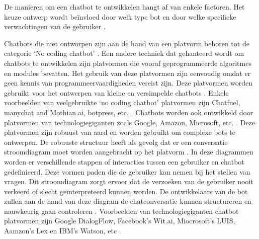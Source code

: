 De manieren om een chatbot te ontwikkelen hangt af van enkele factoren. Het keuze ontwerp wordt beïnvloed door welk type bot en door welke specifieke verwachtingen van de gebruiker \autocite{Rahman2017}.

Chatbots die niet ontworpen zijn aan de hand van een platvorm behoren tot de categorie ‘No coding chatbot’ \autocite{Tamrakar2021}. Een andere techniek dat gehanteerd wordt om chatbots te ontwikkelen zijn platvormen die vooraf geprogrammeerde algoritmes en modules bevatten. Het gebruik van deze platvormen zijn eenvoudig omdat er geen kennis van programmeervaardigheden vereist zijn. Deze platvormen worden gebruikt voor het ontwerpen van kleine en versimpelde chatbots  \autocite{Rahman2017}. Enkele voorbeelden van veelgebruikte ‘no coding chatbot’ platvormen zijn Chatfuel, manychat and Mothian.ai, botpress, etc.  \autocite{Rahman2017}. 
Chatbots worden ook ontwikkeld door platvormen van technologiegiganten zoals Google, Amazon, Microsoft, etc. \autocite{Gkikas2021}. Deze platvormen zijn robuust van aard en worden gebruikt om complexe bots te ontwerpen. De robuuste structuur heeft als gevolg dat er een conversatie stroomdiagram moet worden aangebracht op het platvorm \autocite{Tamrakar2021}. In deze diagrammen worden er verschillende stappen of interacties tussen een gebruiker en chatbot gedefinieerd. Deze vormen paden die de gebruiker kan nemen bij het stellen van vragen. Dit stroomdiagram zorgt ervoor dat de verzoeken van de gebruiker nooit verkeerd of slecht geïnterpreteerd kunnen worden.  De ontwikkelaars van de bot zullen aan de hand van deze diagram de chatconversatie kunnen structureren en nauwkeurig gaan controleren \autocite{CotyM.CollinsColumbus2019}. Voorbeelden van technologiegiganten chatbot platvormen zijn Google DialogFlow, Facebook’s Wit.ai, Miocrosoft’s LUIS, Aamzon’s Lex en IBM’s Watson, etc \autocite{Tamrakar2021}.





